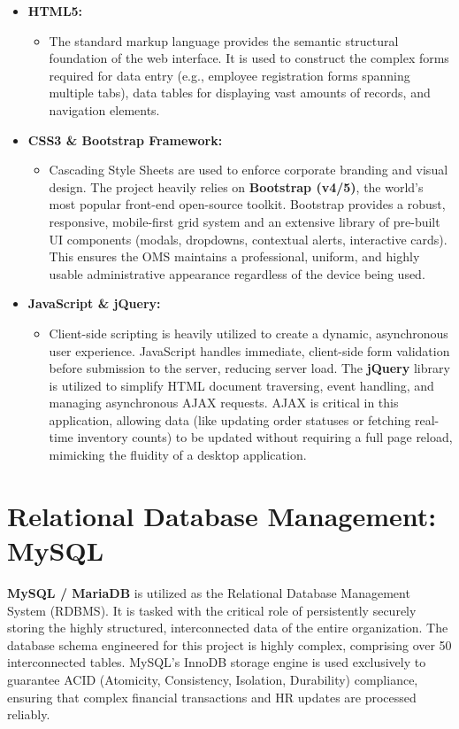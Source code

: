 ﻿\documentclass[12pt,a4paper]{report}
\begin{document}
\begin{itemize}
    \item \textbf{HTML5:}
    \begin{itemize}
        \item The standard markup language provides the semantic structural foundation of the web interface. It is used to construct the complex forms required for data entry (e.g., employee registration forms spanning multiple tabs), data tables for displaying vast amounts of records, and navigation elements.
    \end{itemize}
    \item \textbf{CSS3 \& Bootstrap Framework:}
    \begin{itemize}
        \item Cascading Style Sheets are used to enforce corporate branding and visual design. The project heavily relies on \textbf{Bootstrap (v4/5)}, the world's most popular front-end open-source toolkit. Bootstrap provides a robust, responsive, mobile-first grid system and an extensive library of pre-built UI components (modals, dropdowns, contextual alerts, interactive cards). This ensures the OMS maintains a professional, uniform, and highly usable administrative appearance regardless of the device being used.
    \end{itemize}
    \item \textbf{JavaScript \& jQuery:}
    \begin{itemize}
        \item Client-side scripting is heavily utilized to create a dynamic, asynchronous user experience. JavaScript handles immediate, client-side form validation before submission to the server, reducing server load. The \textbf{jQuery} library is utilized to simplify HTML document traversing, event handling, and managing asynchronous AJAX requests. AJAX is critical in this application, allowing data (like updating order statuses or fetching real-time inventory counts) to be updated without requiring a full page reload, mimicking the fluidity of a desktop application.
    \end{itemize}
\end{itemize}

\section*{Relational Database Management: MySQL}
\textbf{MySQL / MariaDB} is utilized as the Relational Database Management System (RDBMS). It is tasked with the critical role of persistently securely storing the highly structured, interconnected data of the entire organization. The database schema engineered for this project is highly complex, comprising over 50 interconnected tables. MySQL's InnoDB storage engine is used exclusively to guarantee ACID (Atomicity, Consistency, Isolation, Durability) compliance, ensuring that complex financial transactions and HR updates are processed reliably.
\end{document}
